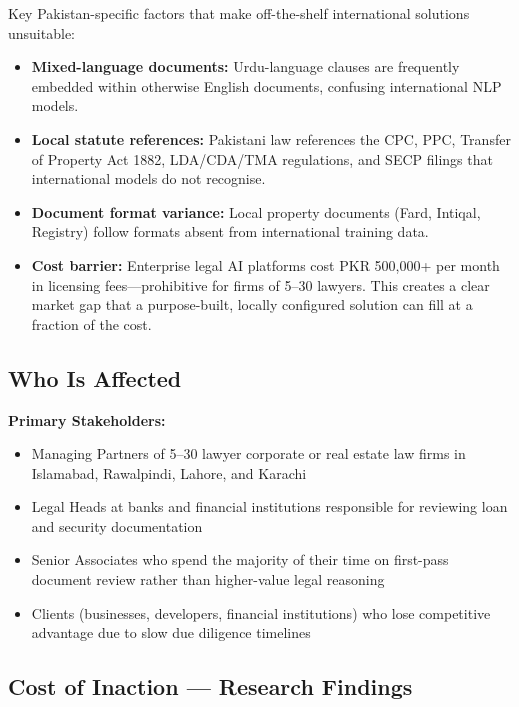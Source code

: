 \documentclass[12pt, a4paper]{article}
\begin{document}
Key Pakistan-specific factors that make off-the-shelf international solutions
unsuitable:

\begin{itemize}[leftmargin=1.5cm]
    \item \textbf{Mixed-language documents:} Urdu-language clauses are frequently
    embedded within otherwise English documents, confusing international NLP models.
    \item \textbf{Local statute references:} Pakistani law references the CPC, PPC,
    Transfer of Property Act 1882, LDA/CDA/TMA regulations, and SECP filings that
    international models do not recognise.
    \item \textbf{Document format variance:} Local property documents (Fard,
    Intiqal, Registry) follow formats absent from international training data.
    \item \textbf{Cost barrier:} Enterprise legal AI platforms cost PKR 500,000+
    per month in licensing fees---prohibitive for firms of 5--30 lawyers. This
    creates a clear market gap that a purpose-built, locally configured solution
    can fill at a fraction of the cost.
\end{itemize}

\subsection{Who Is Affected}

\textbf{Primary Stakeholders:}
\begin{itemize}[leftmargin=1.5cm]
    \item Managing Partners of 5--30 lawyer corporate or real estate law firms in
    Islamabad, Rawalpindi, Lahore, and Karachi
    \item Legal Heads at banks and financial institutions responsible for reviewing
    loan and security documentation
    \item Senior Associates who spend the majority of their time on first-pass
    document review rather than higher-value legal reasoning
    \item Clients (businesses, developers, financial institutions) who lose
    competitive advantage due to slow due diligence timelines
\end{itemize}

\subsection{Cost of Inaction --- Research Findings}
\end{document}
